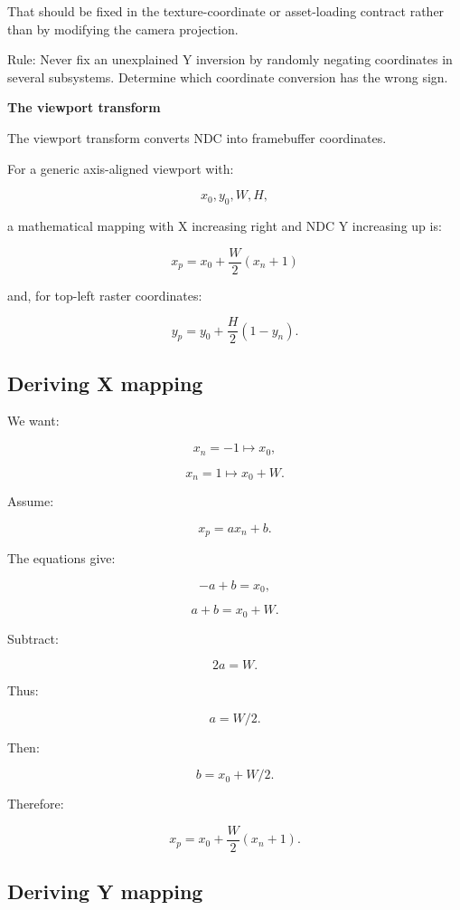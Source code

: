 That should be fixed in the texture-coordinate or asset-loading contract rather than by modifying the camera projection.

Rule: Never fix an unexplained Y inversion by randomly negating coordinates in several subsystems. Determine which coordinate conversion has the wrong sign.

\textbf{The viewport transform}

The viewport transform converts NDC into framebuffer coordinates.

For a generic axis-aligned viewport with:

\[
 x_0,y_0,W,H,
\]

a mathematical mapping with X increasing right and NDC Y increasing up is:

\[
 \boxed{ x_p=x_0+\frac W2(x_n+1) }
\]

and, for top-left raster coordinates:

\[
 \boxed{ y_p=y_0+\frac H2(1-y_n) }.
\]

\subsection{Deriving X mapping}\label{02-foundations-ii-ch033-deriving-x-mapping}

\hypertarget{02-foundations-ii-ch033-deriving-x-mapping}{}

We want:

\[
 x_n=-1\mapsto x_0,
\]

\[
 x_n=1\mapsto x_0+W.
\]

Assume:

\[
 x_p=ax_n+b.
\]

The equations give:

\[
 -a+b=x_0,
\]

\[
 a+b=x_0+W.
\]

Subtract:

\[
 2a=W.
\]

Thus:

\[
 a=W/2.
\]

Then:

\[
 b=x_0+W/2.
\]

Therefore:

\[
 \boxed{ x_p=x_0+\frac W2(x_n+1) }.
\]

\subsection{Deriving Y mapping}\label{02-foundations-ii-ch033-deriving-y-mapping}

